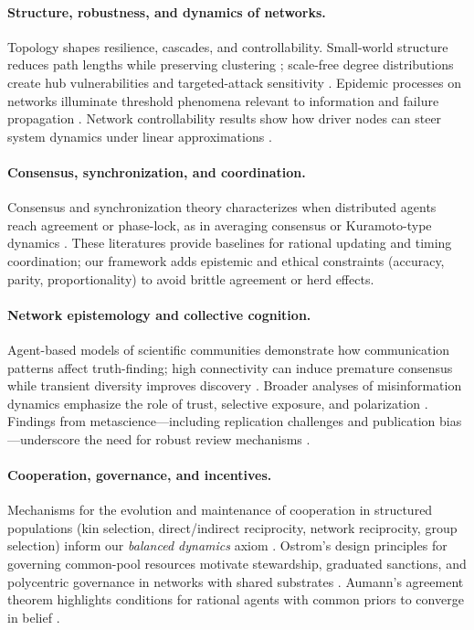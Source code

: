 \documentclass[12pt]{article}
\begin{document}
\paragraph{Structure, robustness, and dynamics of networks.}
Topology shapes resilience, cascades, and controllability. Small-world structure reduces path lengths while preserving clustering \citep{WattsStrogatz1998}; scale-free degree distributions create hub vulnerabilities and targeted-attack sensitivity \citep{Barabasi1999,Newman2003}. Epidemic processes on networks illuminate threshold phenomena relevant to information and failure propagation \citep{PastorSatorras2015}. Network controllability results show how driver nodes can steer system dynamics under linear approximations \citep{LiuSlotineBarabasi2011}.

\paragraph{Consensus, synchronization, and coordination.}
Consensus and synchronization theory characterizes when distributed agents reach agreement or phase-lock, as in averaging consensus or Kuramoto-type dynamics \citep{OlfatiSaber2007}. These literatures provide baselines for rational updating and timing coordination; our framework adds epistemic and ethical constraints (accuracy, parity, proportionality) to avoid brittle agreement or herd effects.

\paragraph{Network epistemology and collective cognition.}
Agent-based models of scientific communities demonstrate how communication patterns affect truth-finding; high connectivity can induce premature consensus while transient diversity improves discovery \citep{Zollman2010}. Broader analyses of misinformation dynamics emphasize the role of trust, selective exposure, and polarization \citep{OConnorWeatherall2019}. Findings from metascience---including replication challenges and publication bias---underscore the need for robust review mechanisms \citep{Ioannidis2005}.

\paragraph{Cooperation, governance, and incentives.}
Mechanisms for the evolution and maintenance of cooperation in structured populations (kin selection, direct/indirect reciprocity, network reciprocity, group selection) inform our \emph{balanced dynamics} axiom \citep{Nowak2006}. Ostrom’s design principles for governing common-pool resources motivate stewardship, graduated sanctions, and polycentric governance in networks with shared substrates \citep{Ostrom1990}. Aumann’s agreement theorem highlights conditions for rational agents with common priors to converge in belief \citep{Aumann1976}.
\end{document}
